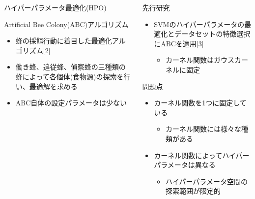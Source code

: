 \documentclass[12pt, cjk, dvipdfmx]{beamer}
\begin{document}
\begin{frame}
\begin{columns}[t]
\begin{column}{0.490\linewidth}
\begin{mybox}{ハイパーパラメータ最適化(HPO)}
            \end{mybox}
            \begin{mybox}{Artificial Bee Colony(ABC)アルゴリズム}
              \begin{itemize}
                \item 蜂の採餌行動に着目した最適化アルゴリズム[2]
                \item 働き蜂、追従蜂、偵察蜂の三種類の蜂によって各個体(食物源)の探索を行い、最適解を求める
                \item ABC自体の設定パラメータは少ない
              \end{itemize}
          \end{mybox}
        \end{column}
        \begin{column}{0.490\linewidth}
          
          \begin{mybox}{先行研究}
            \begin{itemize}
            \item SVMのハイパーパラメータの最適化とデータセットの特徴選択にABCを適用[3]
            \begin{itemize}
              \item カーネル関数はガウスカーネルに固定
            \end{itemize}
            \end{itemize}
          \end{mybox}
          \begin{mybox}{問題点}
            \begin{itemize}
            \item カーネル関数を1つに固定している
             \begin{itemize}
            \item  カーネル関数には様々な種類がある
             \end{itemize}
            \item カーネル関数によってハイパーパラメータは異なる
               \begin{itemize}
                  \item ハイパーパラメータ空間の探索範囲が限定的
               \end{itemize}
            \end{itemize}
          \end{mybox}
           

\end{column}
\end{columns}
\end{frame}
\end{document}
